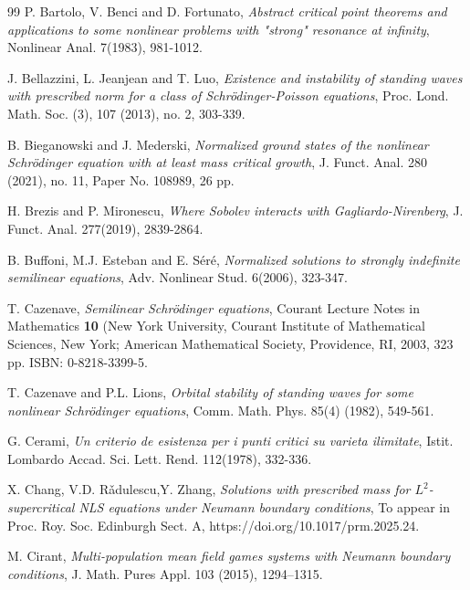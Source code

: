 \documentclass[11pt]{amsart}
\numberwithin{equation}{section}
\begin{document}
\begin{thebibliography}{99}
P. Bartolo, V. Benci and D. Fortunato,  {\it Abstract critical point theorems and applications to some nonlinear problems with "strong" resonance at infinity}, Nonlinear Anal. 7(1983), 981-1012.

 J. Bellazzini, L. Jeanjean and T. Luo, {\it Existence and instability of standing waves with prescribed norm for a class of
	Schr\"odinger-Poisson equations},
Proc. Lond. Math. Soc. (3), 107 (2013), no. 2, 303-339.


 B. Bieganowski and J. Mederski, {\it Normalized ground states of the nonlinear Schr\"odinger equation with at least mass critical growth},
J. Funct. Anal. 280 (2021), no. 11, Paper No. 108989, 26 pp.

H. Brezis and P. Mironescu, {\it Where Sobolev interacts with Gagliardo-Nirenberg},
J. Funct. Anal. 277(2019), 2839-2864.

B. Buffoni, M.J. Esteban and E. S\'er\'e,
{\it Normalized solutions to strongly indefinite semilinear equations},
Adv. Nonlinear Stud. 6(2006), 323-347.



 T. Cazenave, {\it Semilinear Schr\"odinger equations}, Courant Lecture Notes in Mathematics {\bf 10 }(New York
University, Courant Institute of Mathematical Sciences, New York; American Mathematical Society,
Providence, RI, 2003, 323 pp. ISBN: 0-8218-3399-5.

  T. Cazenave and  P.L. Lions, { \it Orbital stability of standing waves for some nonlinear Schr\"odinger equations},  Comm.
Math. Phys.  85(4) (1982), 549-561.


G. Cerami, { \it Un criterio de esistenza per i punti critici su varieta ilimitate}, Istit. Lombardo Accad. Sci. Lett. Rend. 112(1978), 332-336.

X. Chang, V.D. R\v{a}dulescu,Y. Zhang, {\it Solutions with prescribed mass for $L^2$-supercritical NLS equations under Neumann boundary conditions}, To appear in Proc. Roy. Soc. Edinburgh Sect. A, https://doi.org/10.1017/prm.2025.24.

M. Cirant, {\it Multi-population mean field games systems with Neumann boundary conditions},
J. Math. Pures Appl. 103 (2015), 1294--1315.


\end{thebibliography}
\end{document}
